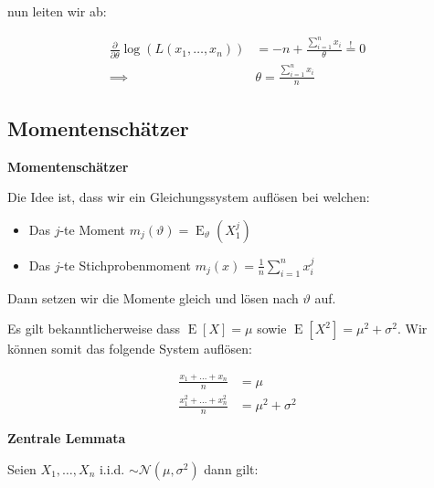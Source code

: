 \documentclass[25pt]{sciposter}
\newcommand{\E}{\operatorname{E}}
\newenvironment{method}[1]{\begin{mdframed}[backgroundcolor=blue!10,innertopmargin=15pt, innerbottommargin=15pt,nobreak=true]
		\textbf{#1 }
	}
	{ 
	\end{mdframed}
}
\newenvironment{thm}[1]{\begin{mdframed}[backgroundcolor=pink!20,innertopmargin=15pt, innerbottommargin=15pt, nobreak=true]
		\textbf{#1 }
	}
	{ 
	\end{mdframed}
}
\begin{document}
\begin{multicols}{3}
nun leiten wir ab:

\begin{align*}
	\frac{\partial}{\partial \theta}\log(L(x_1,\ldots,x_n)) &= -n + \frac{\sum_{i=1}^{n}x_i}{\theta} \stackrel{!}{=} 0 \\
	\implies & \theta = \frac{\sum_{i=1}^{n} x_i}{n}
\end{align*}

\subsection*{Momentenschätzer}

\begin{method}{Momentenschätzer}
	
	Die Idee ist, dass wir ein Gleichungssystem auflösen bei welchen:
	\begin{itemize}
\item Das $j$-te Moment ${\displaystyle m_{j}(\vartheta )=\operatorname {E} _{\vartheta }(X_{1}^{j})}$
\item Das $j$-te Stichprobenmoment ${\displaystyle m_{j}(x)={\frac {1}{n}}\sum _{i=1}^{n}x_{i}^{j}}$
	\end{itemize}
	
	Dann setzen wir die Momente gleich und lösen nach $\vartheta$ auf.
	
\end{method}

Es gilt bekanntlicherweise dass $\E[X] = \mu$ sowie $\E[X^2] = \mu^2 + \sigma^2$. Wir können somit das folgende System auflösen:

\begin{align*}
	\frac{x_1 + \ldots + x_n}{n} &= \mu\\
	\frac{x_1^2 + \ldots + x_n^2}{n} &= \mu^2 + \sigma ^2
\end{align*}



\begin{thm}{Zentrale Lemmata}
	Seien $X_1,\ldots, X_n$ i.i.d. $\sim \mathcal{N}(\mu,\sigma^2)$ dann gilt:
	

\end{thm}
\end{multicols}
\end{document}

